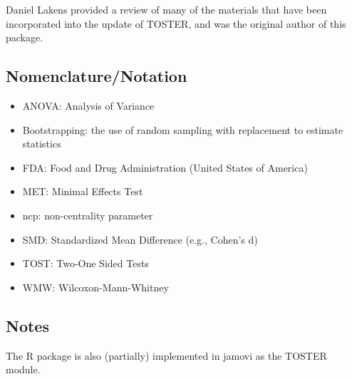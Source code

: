 \documentclass[]{interact}
\theoremstyle{plain}%
\theoremstyle{definition}
\theoremstyle{remark}
\providecommand{\tightlist}{%
  \setlength{\itemsep}{0pt}\setlength{\parskip}{0pt}}
\def\tightlist{}
\begin{document}
Daniel Lakens provided a review of many of the materials that have been
incorporated into the update of TOSTER, and was the original author of
this package.

\hypertarget{nomenclaturenotation}{%
\subsection*{Nomenclature/Notation}\label{nomenclaturenotation}}

\begin{itemize}
\tightlist
\item
  ANOVA: Analysis of Variance
\item
  Bootstrapping: the use of random sampling with replacement to estimate
  statistics
\item
  FDA: Food and Drug Administration (United States of America)
\item
  MET: Minimal Effects Test
\item
  ncp: non-centrality parameter
\item
  SMD: Standardized Mean Difference (e.g., Cohen's d)
\item
  TOST: Two-One Sided Tests
\item
  WMW: Wilcoxon-Mann-Whitney
\end{itemize}

\hypertarget{notes}{%
\subsection*{Notes}\label{notes}}

The R package is also (partially) implemented in jamovi as the TOSTER
module.

\newpage



\end{document}
